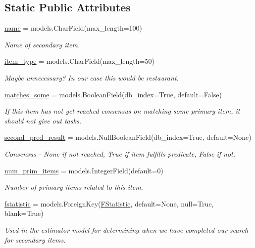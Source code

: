 \subsection*{Static Public Attributes}
\begin{DoxyCompactItemize}
\item 
\mbox{\hyperlink{classjoinapp_1_1models_1_1items_1_1_secondary_item_ab74e6bf80237ddc4109968cedc58c151}{name}} = models.\+Char\+Field(max\+\_\+length=100)
\begin{DoxyCompactList}\small\item\em Name of secondary item. \end{DoxyCompactList}\item 
\mbox{\hyperlink{classjoinapp_1_1models_1_1items_1_1_secondary_item_a2679318a14061852e50df3c6e4e42f62}{item\+\_\+type}} = models.\+Char\+Field(max\+\_\+length=50)
\begin{DoxyCompactList}\small\item\em Maybe unnecessary? In our case this would be restaurant. \end{DoxyCompactList}\item 
\mbox{\hyperlink{classjoinapp_1_1models_1_1items_1_1_secondary_item_a41c32ad76aa5a218929d37bec5e8f271}{matches\+\_\+some}} = models.\+Boolean\+Field(db\+\_\+index=True, default=False)
\begin{DoxyCompactList}\small\item\em If this item has not yet reached consensus on matching some primary item, it should not give out tasks. \end{DoxyCompactList}\item 
\mbox{\hyperlink{classjoinapp_1_1models_1_1items_1_1_secondary_item_ad5707a6b437363484fc3db60e325a970}{second\+\_\+pred\+\_\+result}} = models.\+Null\+Boolean\+Field(db\+\_\+index=True, default=None)
\begin{DoxyCompactList}\small\item\em Consensus -\/ None if not reached, True if item fulfills predicate, False if not. \end{DoxyCompactList}\item 
\mbox{\hyperlink{classjoinapp_1_1models_1_1items_1_1_secondary_item_aec90ed47b1ec4ae92dd1b073b2f6b4a6}{num\+\_\+prim\+\_\+items}} = models.\+Integer\+Field(default=0)
\begin{DoxyCompactList}\small\item\em Number of primary items related to this item. \end{DoxyCompactList}\item 
\mbox{\hyperlink{classjoinapp_1_1models_1_1items_1_1_secondary_item_a5a67693c07b6818c102b3bfd0fc219cc}{fstatistic}} = models.\+Foreign\+Key(\mbox{\hyperlink{classjoinapp_1_1models_1_1estimator_1_1_f_statistic}{F\+Statistic}}, default=None, null=True, blank=True)
\begin{DoxyCompactList}\small\item\em Used in the estimator model for determining when we have completed our search for secondary items. \end{DoxyCompactList}\end{DoxyCompactItemize}



